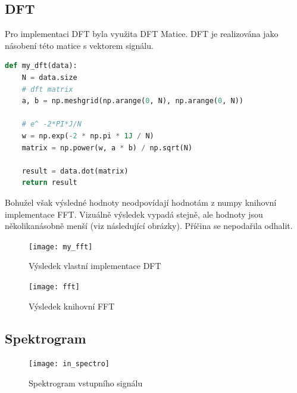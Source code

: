 \documentclass{article}
\begin{document}
\subsection{DFT}
\begin{flushleft}
    Pro implementaci DFT byla využita DFT Matice. DFT je realizována 
    jako násobení této matice s vektorem signálu.

\begin{lstlisting}[language=Python, caption={Implementace DFT}]
def my_dft(data):
    N = data.size
    # dft matrix
    a, b = np.meshgrid(np.arange(0, N), np.arange(0, N))

    # e^ -2*PI*J/N
    w = np.exp(-2 * np.pi * 1J / N)
    matrix = np.power(w, a * b) / np.sqrt(N)

    result = data.dot(matrix)
    return result
\end{lstlisting}

    Bohužel však výsledné hodnoty neodpovídají hodnotám z numpy knihovní implementace FFT.
    Vizuálně výsledek vypadá stejně, ale hodnoty jsou několikanásobně menší (viz následující obrázky).
    Příčina se nepodařila odhalit.

    \begin{figure}[ht]
        \centering
        \texttt{[image: my\_fft]}
        \caption{Výsledek vlastní implementace DFT}
    \end{figure}

    \begin{figure}[ht]
        \centering
        \texttt{[image: fft]}
        \caption{Výsledek knihovní FFT}
    \end{figure}
\end{flushleft}

\newpage

\subsection{Spektrogram}
\begin{flushleft}

    \begin{figure}[ht]
        \texttt{[image: in\_spectro]}
        \caption{Spektrogram vstupního signálu}
    \end{figure}

\end{flushleft}
\end{document}
